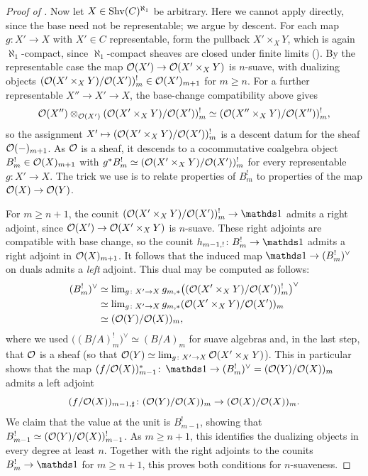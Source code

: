 \documentclass[11pt]{book}
\begin{document}
\begin{proof}[Proof of ]
		Now let $X \in \operatorname{Shv}(C)^{\aleph_1}$ be arbitrary. Here we cannot apply  directly, since the base need not be representable; we argue by descent. For each map $g\colon X' \to X$ with $X' \in C$ representable, form the pullback $X' \times_X Y$, which is again $\aleph_1$-compact, since $\aleph_1$-compact sheaves are closed under finite limits (). By the representable case the map $\mathcal{O}(X') \to \mathcal{O}(X' \times_X Y)$ is $n$-suave, with dualizing objects $(\mathcal{O}(X' \times_X Y)/\mathcal{O}(X'))^!_m \in \mathcal{O}(X')_{m+1}$ for $m \geq n$. For a further representable $X'' \to X' \to X$, the base-change compatibility above gives
		\[
			\mathcal{O}(X'') \otimes_{\mathcal{O}(X')} (\mathcal{O}(X' \times_X Y)/\mathcal{O}(X'))^!_m \simeq (\mathcal{O}(X'' \times_X Y)/\mathcal{O}(X''))^!_m,
		\]
		so the assignment $X' \mapsto (\mathcal{O}(X' \times_X Y)/\mathcal{O}(X'))^!_m$ is a descent datum for the sheaf $\mathcal{O}(-)_{m+1}$. As $\mathcal{O}$ is a sheaf, it descends to a cocommutative coalgebra object $B^!_m \in \mathcal{O}(X)_{m+1}$ with $g^*B^!_m \simeq (\mathcal{O}(X' \times_X Y)/\mathcal{O}(X'))^!_m$ for every representable $g\colon X' \to X$. The trick we use is to relate properties of $B^!_m$ to properties of the map $\mathcal{O}(X) \to \mathcal{O}(Y)$.

		For $m \geq n+1$, the counit $(\Oo(X' \times_X Y)/\Oo(X'))^!_m \to \unit$ admits a right adjoint, since $\mathcal{O}(X') \to \mathcal{O}(X' \times_X Y)$ is $n$-suave. These right adjoints are compatible with base change, so the counit $h_{m-1,!}\colon B^!_m \to \unit$ admits a right adjoint in $\mathcal{O}(X)_{m+1}$. It follows that the induced map $\unit \to (B^!_m)^{\vee}$ on duals admits a \emph{left} adjoint. This dual may be computed as follows:
		\begin{align*}
			(B^!_m)^{\vee}
			&\simeq \operatorname{lim}_{g\colon X' \to X} g_{m,*}\bigl((\mathcal{O}(X' \times_X Y)/\mathcal{O}(X'))^!_m\bigr)^{\vee} \\
			& \simeq \operatorname{lim}_{g\colon X' \to X} g_{m,*}(\mathcal{O}(X' \times_X Y)/\mathcal{O}(X'))_m \\
			& \simeq (\mathcal{O}(Y)/\mathcal{O}(X))_m,
		\end{align*}
		where we used $\bigl((B/A)^!_m\bigr)^{\vee} \simeq (B/A)_m$ for suave algebras and, in the last step, that $\mathcal{O}$ is a sheaf (so that $\mathcal{O}(Y) \simeq \operatorname{lim}_{g\colon X' \to X} \mathcal{O}(X' \times_X Y)$). This in particular shows that the map $(f/\Oo(X))^*_{m-1}\colon \unit \to (B^!_m)^{\vee} = (\Oo(Y)/\Oo(X))_m$ admits a left adjoint
		\[
			(f/\mathcal{O}(X))_{m-1,\sharp}\colon (\mathcal{O}(Y)/\mathcal{O}(X))_m \to (\mathcal{O}(X)/\mathcal{O}(X))_m.
		\]
		We claim that the value at the unit is $B^!_{m-1}$, showing that $B^!_{m-1} \simeq (\mathcal{O}(Y)/\mathcal{O}(X))^!_{m-1}$. As $m \geq n+1$, this identifies the dualizing objects in every degree at least $n$. Together with the right adjoints to the counits $B^!_m \to \unit$ for $m \geq n+1$, this proves both conditions for $n$-suaveness.


\end{proof}
\end{document}

